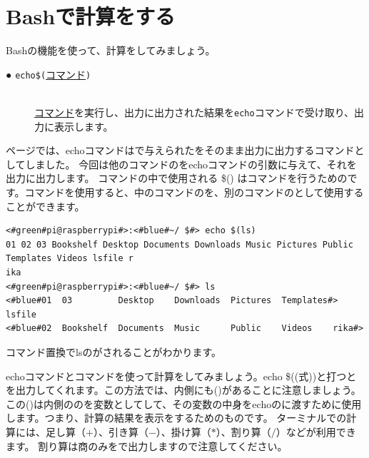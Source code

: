 \documentclass[text03.tex]{subfiles}
\begin{document}
\newpage
\section{Bashで計算をする}

Bashの機能を使って、計算をしてみましょう。
\begin{description}
    \item[● \texttt{echo}\textvisiblespace\texttt{\$(}\underline{コマンド}\texttt{)}]\mbox{}\\
    \underline{コマンド}を実行し、出力に出力された結果を\texttt{echo}コマンドで受け取り、出力に表示します。
\end{description}

\pageref{cmd:echo}ページでは、echoコマンドはで与えられたをそのまま出力に出力するコマンドとしてしました。
今回は他のコマンドのをechoコマンドの引数に与えて、それを出力に出力します。
コマンドの中で使用される \$() はコマンドを行うためのです。コマンドを使用すると、中のコマンドのを、別のコマンドのとして使用することができます。
\begin{lstlisting}[caption=echo コマンド置換を使った例1, label=cmdsbs:echo]
<#green#pi@raspberrypi#>:<#blue#~/ $#> echo $(ls)
01 02 03 Bookshelf Desktop Documents Downloads Music Pictures Public Templates Videos lsfile r
ika
<#green#pi@raspberrypi#>:<#blue#~/ $#> ls
<#blue#01  03         Desktop    Downloads  Pictures  Templates#> lsfile
<#blue#02  Bookshelf  Documents  Music      Public    Videos    rika#> 
\end{lstlisting}
コマンド置換でlsのがされることがわかります。

echoコマンドとコマンドを使って計算をしてみましょう。echo \$((式))と打つとを出力してくれます。この方法では、内側にも()があることに注意しましょう。この()は内側ののを変数としてして、その変数の中身をechoのに渡すために使用します。つまり、計算の結果を表示をするためのものです。
ターミナルでの計算には、足し算（$+$）、引き算（$-$）、掛け算（$*$）、割り算（$/$）などが利用できます。 割り算は商のみをで出力しますので注意してください。
\end{document}
